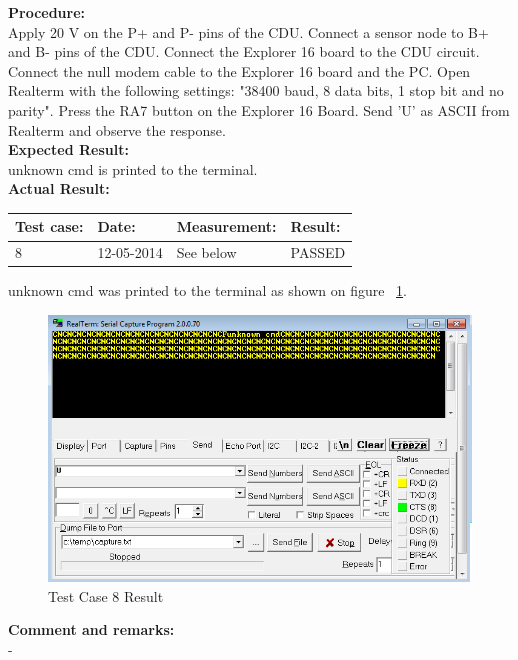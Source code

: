 \textbf{Procedure:}\\
Apply 20 V on the P+ and P- pins of the CDU. Connect a sensor node to B+ and B- pins of the CDU. Connect the Explorer 16 board to the CDU circuit. Connect the null modem cable to the Explorer 16 board and the PC. Open Realterm with the following settings: "38400 baud, 8 data bits, 1 stop bit and no parity". Press the RA7 button on the Explorer 16 Board. Send 'U' as ASCII from Realterm and observe the response.\\

\textbf{Expected Result:}\\
unknown cmd is printed to the terminal.\\

\textbf{Actual Result:}\\
\begin{table}[H]
\centering
\begin{tabular}{|p{2cm}|p{2cm}|p{3cm}|p{2cm}|}\hline
\textbf{Test case:} & \textbf{Date:} & \textbf{Measurement:} & \textbf{Result:} \\ \hline
8 & 12-05-2014 & See below & PASSED \\ \hline
\end{tabular}
\end{table}
unknown cmd was printed to the terminal as shown on figure ~\ref{fig:InteTestCase8}.
\begin{figure}[H]
\centering
\includegraphics[width=1\textwidth]{billeder/inte08}
\caption{Test Case 8 Result}
\label{fig:InteTestCase8}
\end{figure}

\textbf{Comment and remarks:}\\
-\\